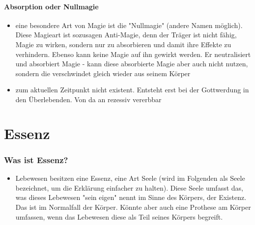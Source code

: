 \subsubsection{Absorption oder Nullmagie}
\begin{itemize}
	\item eine besondere Art von Magie ist die "Nullmagie" (andere Namen möglich). Diese Magieart ist sozusagen Anti-Magie, denn der Träger ist nicht fähig, Magie zu wirken, sondern nur zu absorbieren und damit ihre Effekte zu verhindern. Ebenso kann keine Magie auf ihn gewirkt werden. Er neutralisiert und absorbiert Magie - kann diese absorbierte Magie aber auch nicht nutzen, sondern die verschwindet gleich wieder aus seinem Körper
	\item zum aktuellen Zeitpunkt nicht existent. Entsteht erst bei der Gottwerdung in den Überlebenden. Von da an rezessiv vererbbar
\end{itemize}


\chapter{Essenz}
\subsection{Was ist Essenz?}
\begin{itemize}
	\item Lebewesen besitzen eine Essenz, eine Art Seele (wird im Folgenden als Seele bezeichnet, um die Erklärung einfacher zu halten). Diese Seele umfasst das, was dieses Lebewesen "sein eigen" nennt im Sinne des Körpers, der Existenz. Das ist im Normalfall der Körper. Könnte aber auch eine Prothese am Körper umfassen, wenn das Lebewesen diese als Teil seines Körpers begreift.
\end{itemize}